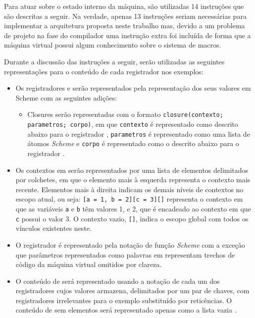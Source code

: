 Para atuar sobre o estado interno da máquina, são utilizadas 14 instruções que são
descritas a seguir. Na verdade, apenas 13 instruções seriam necessárias para
implementar a arquitetura proposta neste trabalho mas, devido a um problema de
projeto na fase do compilador uma instrução extra foi incluída de forma que a
máquina virtual possui algum conhecimento sobre o sistema de macros.

Durante a discussão das instruções a seguir, serão utilizadas as seguintes
representações para o conteúdo de cada registrador nos exemplos:

\begin{itemize}

\item Os registradores  e  serão representados
pela representação dos seus valores em Scheme
 com as seguintes adições:
 \begin{itemize}
 
 \item Closures serão representadas com o formato \texttt{closure(contexto;
parametros; corpo)}, em que \texttt{contexto} é representado como descrito
abaixo para o registrador , \texttt{parametros} é
representado como uma lista de átomos \textit{Scheme} e \texttt{corpo} é
representado como o descrito abaixo para o registrador .

 \end{itemize}
\item Os contextos em  serão representados por uma lista de
elementos delimitados por colchetes, em que o elemento mais à esquerda
representa o contexto mais recente. Elementos mais à direita indicam os demais
níveis de contextos no escopo atual, ou seja: \texttt{[a = 1, b = 2][c = 3][]}
representa o contexto em que as variáveis \texttt{a} e \texttt{b} têm valores
1, e 2, que é encadeado ao contexto em que \texttt{c} possui o valor 3. O
contexto vazio, \texttt{[]}, indica o escopo global com todos os vínculos
existentes neste.

\item O registrador  é representado pela notação de função
\textit{Scheme} com a exceção que parâmetros representados como palavras em
 representam trechos de código da máquina virtual omitidos por
clareza.

\item O conteúdo de  será representado usando a notação de cada um
dos registradores cujos valores armazena, delimitados por um par de chaves, com
registradores irrelevantes para o exemplo substituído por reticências. O
conteúdo de  sem elementos será representado apenas como a lista
vazia \sctt{()}.

\end{itemize} 

